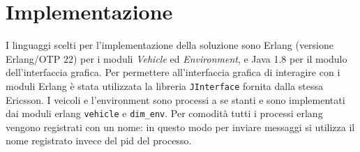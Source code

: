 \documentclass{memoir}
\begin{document}
\chapter{Implementazione}

I linguaggi scelti per l'implementazione della soluzione sono Erlang (versione
Erlang/OTP 22) per i moduli \emph{Vehicle} ed \emph{Environment}, e Java 1.8 per
il modulo dell'interfaccia grafica. Per permettere all'interfaccia grafica di
interagire con i moduli Erlang è stata utilizzata la libreria
\texttt{JInterface} fornita dalla stessa Ericsson. I veicoli e l'environment
sono processi a se stanti e sono implementati dai moduli erlang \texttt{vehicle}
e \texttt{dim\_env}. Per comodità tutti i processi erlang vengono registrati con
un nome: in questo modo per inviare messaggi si utilizza il nome registrato
invece del pid del processo.
\end{document}
